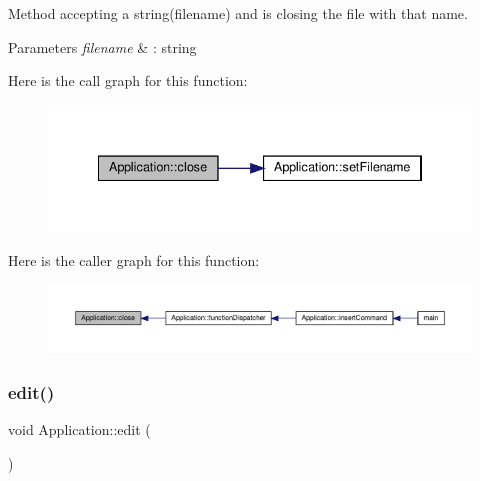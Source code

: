 Method accepting a string(filename) and is closing the file with that name. 
\begin{DoxyParams}{Parameters}
{\em filename} & \+: string \\
\hline
\end{DoxyParams}
Here is the call graph for this function\+:
\nopagebreak
\begin{figure}[H]
\begin{center}
\leavevmode
\includegraphics[width=334pt]{class_application_a5a7dcf61b6701a2b2665c78e4e074e73_cgraph}
\end{center}
\end{figure}
Here is the caller graph for this function\+:
\nopagebreak
\begin{figure}[H]
\begin{center}
\leavevmode
\includegraphics[width=350pt]{class_application_a5a7dcf61b6701a2b2665c78e4e074e73_icgraph}
\end{center}
\end{figure}
\mbox{\label{class_application_a4b193bf9c8be7105e89a2323ea77b1f4}} 
\subsubsection{\texorpdfstring{edit()}{edit()}}
{\footnotesize\ttfamily void Application\+::edit (\begin{DoxyParamCaption}{ }\end{DoxyParamCaption})\hspace{0.3cm}{\ttfamily [private]}}

